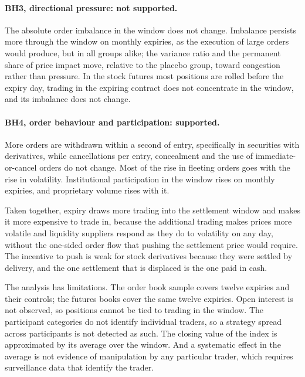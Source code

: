 \paragraph{BH3, directional pressure: not supported.} The absolute order imbalance in the window
does not change. Imbalance persists more through the window on monthly expiries, as the
execution of large orders would produce, but in all groups alike; the variance ratio and the
permanent share of price impact move, relative to the placebo group, toward congestion rather
than pressure. In the stock futures most positions are rolled before the expiry day, trading in
the expiring contract does not concentrate in the window, and its imbalance does not change.

\paragraph{BH4, order behaviour and participation: supported.} More orders are withdrawn within a
second of entry, specifically in securities with derivatives, while cancellations per entry,
concealment and the use of immediate-or-cancel orders do not change. Most of the rise in
fleeting orders goes with the rise in volatility. Institutional participation
in the window rises on monthly expiries, and proprietary volume rises with it.

Taken together, expiry draws more trading into the settlement window and makes it more expensive
to trade in, because the additional trading makes prices more volatile and liquidity
suppliers respond as they do to volatility on any day, without the one-sided order flow that pushing
the settlement price would require. The incentive to push is weak for stock derivatives because
they were settled by delivery, and the one settlement that is displaced is the one paid in cash.

The analysis has limitations. The order book sample covers twelve expiries and their controls;
the futures books cover the same twelve expiries. Open interest is not observed, so positions cannot be
tied to trading in the window. The participant categories do not identify individual traders, so
a strategy spread across participants is not detected as such. The closing value of the index is
approximated by its average over the window. And a systematic effect in the average is not
evidence of manipulation by any particular trader, which requires surveillance data that
identify the trader.
